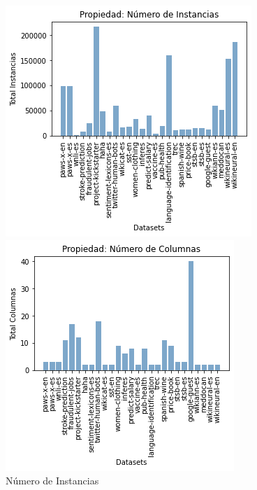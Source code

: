 \begin{figure}
  \begin{minipage}[b]{0.31\textwidth}
    \centering
    \includegraphics[width=\textwidth]{Graphics/results/instances.png}
      \caption{Número de Instancias}
      \label{fig:instances}
    \end{minipage} 
\hspace{0.01cm}
  \begin{minipage}[b]{0.31\textwidth}
    \centering
      \includegraphics[width=\textwidth]{Graphics/results/columns.png}

\end{minipage}
\end{figure}

